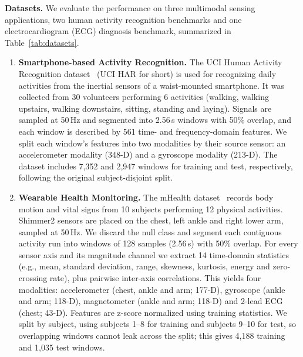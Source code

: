 \documentclass[sigconf]{acmart}
\begin{document}
\textbf{Datasets.}
We evaluate the performance on three multimodal sensing applications, two human activity recognition benchmarks and one electrocardiogram (ECG) diagnosis benchmark, summarized in Table~\ref{tab:datasets}.

\begin{enumerate}
  \item \textbf{Smartphone-based Activity Recognition.}
  The UCI Human Activity Recognition dataset~\cite{anguita2013public} (UCI HAR for short) is used for recognizing daily activities from the inertial sensors of a waist-mounted smartphone. It was collected from 30 volunteers performing 6 activities (walking, walking upstairs, walking downstairs, sitting, standing and laying). Signals are sampled at 50\,Hz and segmented into 2.56\,s windows with 50\% overlap, and each window is described by 561 time- and frequency-domain features. We split each window's features into two modalities by their source sensor: an accelerometer modality (348-D) and a gyroscope modality (213-D). The dataset includes 7,352 and 2,947 windows for training and test, respectively, following the original subject-disjoint split.

  \item \textbf{Wearable Health Monitoring.}
  The mHealth dataset~\cite{banos2014mhealthdroid} records body motion and vital signs from 10 subjects performing 12 physical activities. Shimmer2 sensors are placed on the chest, left ankle and right lower arm, sampled at 50\,Hz. We discard the null class and segment each contiguous activity run into windows of 128 samples (2.56\,s) with 50\% overlap. For every sensor axis and its magnitude channel we extract 14 time-domain statistics (e.g., mean, standard deviation, range, skewness, kurtosis, energy and zero-crossing rate), plus pairwise inter-axis correlations. This yields four modalities: accelerometer (chest, ankle and arm; 177-D), gyroscope (ankle and arm; 118-D), magnetometer (ankle and arm; 118-D) and 2-lead ECG (chest; 43-D). Features are z-score normalized using training statistics. We split by subject, using subjects 1--8 for training and subjects 9--10 for test, so overlapping windows cannot leak across the split; this gives 4,188 training and 1,035 test windows.


\end{enumerate}
\end{document}
